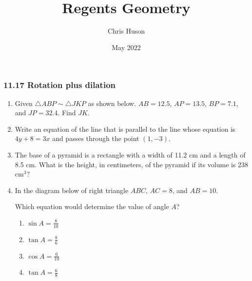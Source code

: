 \documentclass[12pt, oneside]{article}
\title{Regents Geometry}
\author{Chris Huson}
\date{May 2022}
\begin{document}
\subsubsection*{11.17 Rotation plus dilation}
\begin{enumerate}[itemsep=1.2cm]
\item Given $\triangle ABP \sim \triangle JKP$ as shown below. $AB=12.5$, $AP=13.5$, $BP=7.1$, and $JP=32.4$. Find $JK$.
    \begin{flushright}
      \end{flushright}

\item Write an equation of the line that is parallel to the line whose equation is $4y+8=3x$ and passes through the point $(1,-3)$.

\item The base of a pyramid is a rectangle with a width of 11.2 cm and a length of 8.5 cm. What is the height, in centimeters, of the pyramid if its volume is 238 cm$^3$?

\item In the diagram below of right triangle $ABC$, $AC=8$, and $AB=10$.
  \begin{center}
  \end{center}
    Which equation would determine the value of angle $A$?
  \begin{multicols}{2}
    \begin{enumerate}
      \item $\displaystyle \sin A = \frac{8}{10}$
      \item $\displaystyle \tan A = \frac{8}{6}$
      \item $\displaystyle \cos A = \frac{6}{10}$
      \item $\displaystyle \tan A = \frac{6}{8}$
    \end{enumerate}
  \end{multicols}


\end{enumerate}
\end{document}
